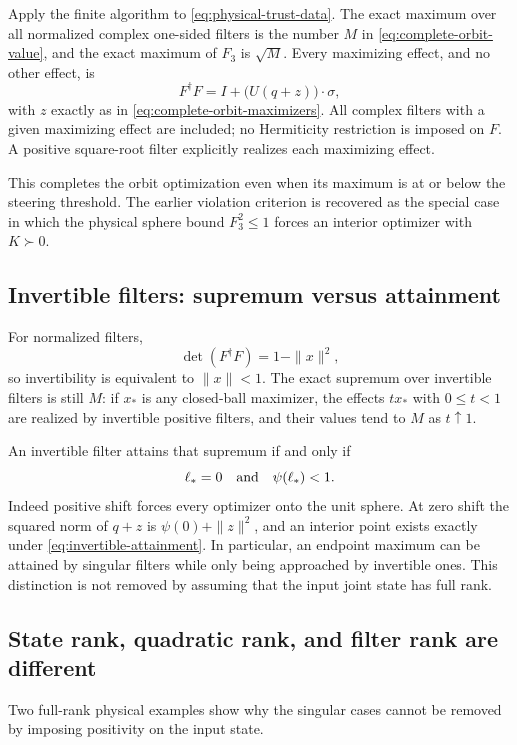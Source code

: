 Apply the finite algorithm to \eqref{eq:physical-trust-data}.
The exact maximum over all normalized complex one-sided filters is the
number $M$ in \eqref{eq:complete-orbit-value}, and the exact maximum of
$F_3$ is $\sqrt M$.  Every maximizing effect, and no other effect, is
\[
 F^\dagger F=I+\bigl(U(q+z)\bigr)\cdot\sigma,
\]
with $z$ exactly as in \eqref{eq:complete-orbit-maximizers}.  All complex
filters with a given maximizing effect are included; no Hermiticity
restriction is imposed on $F$.  A positive square-root filter explicitly
realizes each maximizing effect.

This completes the orbit optimization even when its maximum is at or below
the steering threshold.  The earlier violation criterion is recovered as
the special case in which the physical sphere bound $F_3^2\leq1$ forces
an interior optimizer with $K\succ0$.

\subsection{Invertible filters: supremum versus attainment}

For normalized filters,
\[
 \det(F^\dagger F)=1-\|x\|^2,
\]
so invertibility is equivalent to $\|x\|<1$.  The exact supremum over
invertible filters is still $M$: if $x_*$ is any closed-ball maximizer,
the effects $t x_*$ with $0\leq t<1$ are realized by invertible positive
filters, and their values tend to $M$ as $t\uparrow1$.

An invertible filter attains that supremum if and only if
\begin{equation}
 \ell_*=0\quad\hbox{and}\quad\psi(\ell_*)<1.
 \label{eq:invertible-attainment}
\end{equation}
Indeed positive shift forces every optimizer onto the unit sphere.
At zero shift the squared norm of $q+z$ is
$\psi(0)+\|z\|^2$, and an interior point exists exactly under
\eqref{eq:invertible-attainment}.  In particular, an endpoint maximum
can be attained by singular filters while only being approached by
invertible ones.  This distinction is not removed by assuming that the
input joint state has full rank.

\subsection{State rank, quadratic rank, and filter rank are different}
Two full-rank physical examples show why the singular cases cannot be
removed by imposing positivity on the input state.

